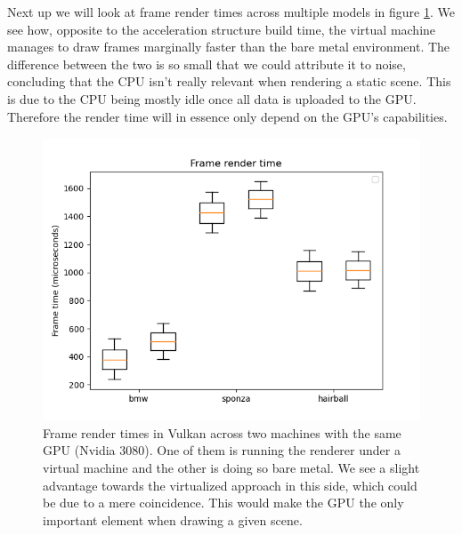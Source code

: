 Next up we will look at frame render times across multiple models in figure \ref{vulkan-frame-times-bm-vm-comparison}. We see how, opposite to the acceleration structure build time, the virtual machine manages to draw frames marginally faster than the bare metal environment. The difference between the two is so small that we could attribute it to noise, concluding that the CPU isn't really relevant when rendering a static scene. This is due to the CPU being mostly idle once all data is uploaded to the GPU. Therefore the render time will in essence only depend on the GPU's capabilities.

\begin{figure}[hbt!]
    \centering
    \includegraphics[width=1.0\textwidth]{figuras/vulkan-frametimes-baremetal-virtualized-comparison.png}
    \caption{Frame render times in Vulkan across two machines with the same GPU (Nvidia 3080). One of them is running the renderer under a virtual machine and the other is doing so bare metal. We see a slight advantage towards the virtualized approach in this side, which could be due to a mere coincidence. This would make the GPU the only important element when drawing a given scene.}
    \label{vulkan-frame-times-bm-vm-comparison}
\end{figure}
